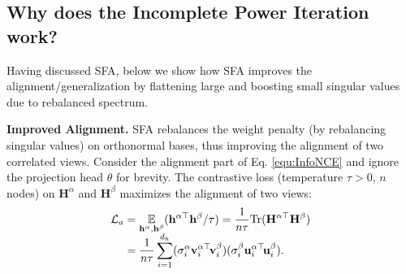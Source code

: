 
\vspace{-0.3cm}
\subsection{$\!$Why does the Incomplete Power Iteration work?$\!\!\!\!\!$}

Having discussed SFA, below we show how SFA improves the alignment/generalization  by flattening large and boosting small singular values due to rebalanced spectrum. 

\vspace{0.1cm}
\noindent 
\textbf{Improved Alignment.}
\label{sec:improveAligment}
SFA rebalances the weight penalty (by rebalancing singular values)  on orthonormal bases, thus improving the alignment of two correlated views. %
Consider the alignment part of Eq. \eqref{equ:InfoNCE} and ignore the projection head $\theta$ for brevity. The contrastive loss (temperature $\tau>0$,  $n$ nodes) on  $\mathbf{H}^\alpha$ and $\mathbf{H}^\beta$  %
maximizes the alignment of two views:
\vspace{-0.1cm}
\begin{equation}
\label{equ:EignAlignOri}
\!
\begin{aligned}
\mathcal{L}_{a}& = \underset{\mathbf{h}^\alpha,\mathbf{h}^\beta}{\mathbb{E}}(\mathbf{h}^{\alpha\top}\mathbf{h}^\beta/\tau) = \frac{1}{n\tau}\text{Tr}(\mathbf{H}^{\alpha\top}\mathbf{H}^\beta)\\[-5pt]
&=\frac{1}{n\tau}\sum_{i=1}^{d_h} ({\sigma}^\alpha_i{\mathbf{v}}_{i}^{\alpha\top}\!{\mathbf{v}}^\beta_{i})({\sigma}^{\beta}_i {{\mathbf{u}}}^{\alpha\top}_{i}\!{\mathbf{u}}^{\beta}_{i} ).%
\end{aligned}
%
\vspace{-0.2cm}
\end{equation}

